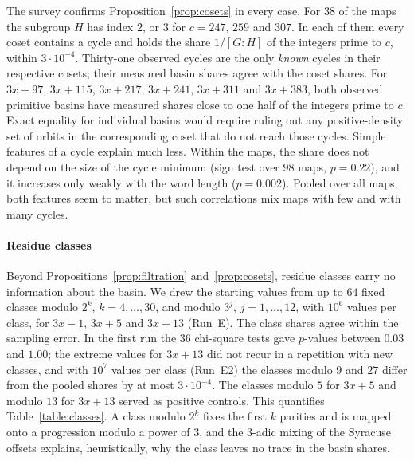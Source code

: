 \documentclass[12pt]{amsart}
\theoremstyle{definition}
\theoremstyle{remark}
\begin{document}
The survey confirms Proposition~\ref{prop:cosets} in every case. For $38$ of the maps the subgroup $H$ has index $2$, or $3$ for $c=247$, $259$ and $307$. In each of them every coset contains a cycle and holds the share $1/[G:H]$ of the integers prime to $c$, within $3\cdot10^{-4}$. Thirty-one observed cycles are the only \emph{known} cycles in their respective cosets; their measured basin shares agree with the coset shares. For $3x+97$, $3x+115$, $3x+217$, $3x+241$, $3x+311$ and $3x+383$, both observed primitive basins have measured shares close to one half of the integers prime to $c$. Exact equality for individual basins would require ruling out any positive-density set of orbits in the corresponding coset that do not reach those cycles. Simple features of a cycle explain much less. Within the maps, the share does not depend on the size of the cycle minimum (sign test over $98$ maps, $p=0.22$), and it increases only weakly with the word length ($p=0.002$). Pooled over all maps, both features seem to matter, but such correlations mix maps with few and with many cycles.

\paragraph{Residue classes} Beyond Propositions~\ref{prop:filtration} and~\ref{prop:cosets}, residue classes carry no information about the basin. We drew the starting values from up to $64$ fixed classes modulo $2^k$, $k=4,\dots,30$, and modulo $3^j$, $j=1,\dots,12$, with $10^6$ values per class, for $3x-1$, $3x+5$ and $3x+13$ (Run~E). The class shares agree within the sampling error. In the first run the $36$ chi-square tests gave $p$-values between $0.03$ and $1.00$; the extreme values for $3x+13$ did not recur in a repetition with new classes, and with $10^7$ values per class (Run~E2) the classes modulo $9$ and $27$ differ from the pooled shares by at most $3\cdot10^{-4}$. The classes modulo $5$ for $3x+5$ and modulo $13$ for $3x+13$ served as positive controls. This quantifies Table~\ref{table:classes}. A class modulo $2^k$ fixes the first $k$ parities and is mapped onto a progression modulo a power of $3$, and the $3$-adic mixing of the Syracuse offsets \cite{Tao_2022} explains, heuristically, why the class leaves no trace in the basin shares.
\end{document}
